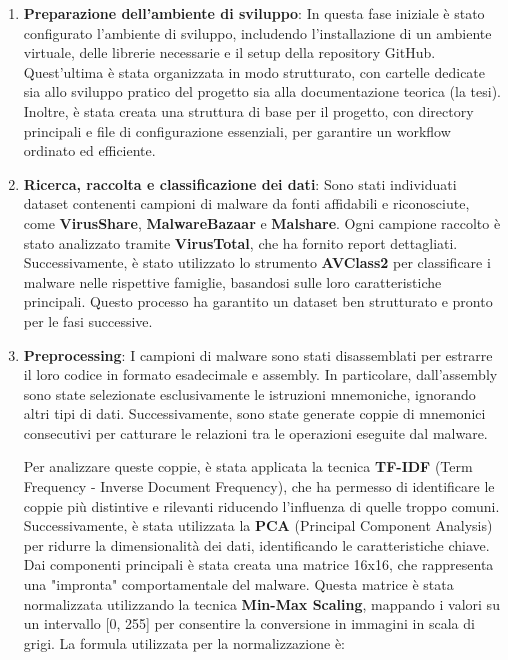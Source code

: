 \begin{enumerate}
    \item \textbf{Preparazione dell'ambiente di sviluppo}: 
    In questa fase iniziale è stato configurato l'ambiente di sviluppo, includendo l'installazione di un ambiente virtuale, delle librerie necessarie e il setup della repository GitHub. Quest'ultima è stata organizzata in modo strutturato, con cartelle dedicate sia allo sviluppo pratico del progetto sia alla documentazione teorica (la tesi). Inoltre, è stata creata una struttura di base per il progetto, con directory principali e file di configurazione essenziali, per garantire un workflow ordinato ed efficiente.

    \item \textbf{Ricerca, raccolta e classificazione dei dati}: 
    Sono stati individuati dataset contenenti campioni di malware da fonti affidabili e riconosciute, come \textbf{VirusShare}, \textbf{MalwareBazaar} e \textbf{Malshare}. Ogni campione raccolto è stato analizzato tramite \textbf{VirusTotal}, che ha fornito report dettagliati. Successivamente, è stato utilizzato lo strumento \textbf{AVClass2} \cite{site:avclass} per classificare i malware nelle rispettive famiglie, basandosi sulle loro caratteristiche principali. Questo processo ha garantito un dataset ben strutturato e pronto per le fasi successive.

    \item \textbf{Preprocessing}: 
    I campioni di malware sono stati disassemblati per estrarre il loro codice in formato esadecimale e assembly. In particolare, dall'assembly sono state selezionate esclusivamente le istruzioni mnemoniche, ignorando altri tipi di dati. Successivamente, sono state generate coppie di mnemonici consecutivi per catturare le relazioni tra le operazioni eseguite dal malware. 

    Per analizzare queste coppie, è stata applicata la tecnica \textbf{TF-IDF} (Term Frequency - Inverse Document Frequency)\cite{site:tfidf}, che ha permesso di identificare le coppie più distintive e rilevanti riducendo l'influenza di quelle troppo comuni. Successivamente, è stata utilizzata la \textbf{PCA} (Principal Component Analysis) \cite{article:pca} per ridurre la dimensionalità dei dati, identificando le caratteristiche chiave. Dai componenti principali è stata creata una matrice 16x16, che rappresenta una "impronta" comportamentale del malware. Questa matrice è stata normalizzata utilizzando la tecnica \textbf{Min-Max Scaling}, mappando i valori su un intervallo [0, 255] per consentire la conversione in immagini in scala di grigi. La formula utilizzata per la normalizzazione è:


\end{enumerate}
